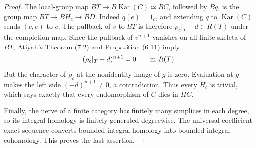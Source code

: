 \begin{proof}
The local-group map $BT\to B\operatorname{Kar}(C)\simeq BC$, followed
by $Bq$, is the group map $BT\to BH_c\to BD$. Indeed $q(e)=1_c$,
and extending $q$ to $\operatorname{Kar}(C)$ sends $(c,e)$ to $c$.
The pullback of $v$ to $BT$ is therefore
$\rho_c|_T-d\in R(T)$ under the completion map. Since the pullback
of $v^{n+1}$ vanishes on all finite skeleta of $BT$, Atiyah's Theorem
(7.2) and Proposition (6.11) \cite{atiyah1961} imply
\[
 (\rho_c|_T-d)^{n+1}=0\qquad\hbox{in }R(T).
\]
But the character of $\rho_c$ at the nonidentity image of $g$ is zero.
Evaluation at $g$ makes the left side $(-d)^{n+1}\ne0$, a contradiction.
Thus every $H_c$ is trivial, which says exactly that every endomorphism
of $C$ dies in $\Pi C$.

Finally, the nerve of a finite category has finitely many simplices in
each degree, so its integral homology is finitely generated degreewise.
The universal coefficient exact sequence converts bounded integral
homology into bounded integral cohomology. This proves the last assertion.
\end{proof}

